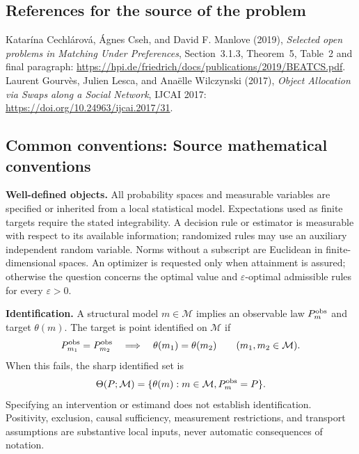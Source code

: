 \documentclass[11pt,a4paper]{article}
\begin{document}
\subsection*{References for the source of the problem}
Katar\'ina Cechl\'arov\'a, \'Agnes Cseh, and David F. Manlove (2019), \emph{Selected open problems in Matching Under Preferences}, Section~3.1.3, Theorem~5, Table~2 and final paragraph: \url{https://hpi.de/friedrich/docs/publications/2019/BEATCS.pdf}. Laurent Gourv\`es, Julien Lesca, and Ana\"elle Wilczynski (2017), \emph{Object Allocation via Swaps along a Social Network}, IJCAI 2017: \url{https://doi.org/10.24963/ijcai.2017/31}.

\subsection*{Common conventions: Source mathematical conventions}

\textbf{Well-defined objects.}
All probability spaces and measurable variables are specified or inherited
from a local statistical model. Expectations used as finite targets require
the stated integrability. A decision rule or estimator is measurable with
respect to its available information; randomized rules may use an auxiliary
independent random variable. Norms without a subscript are Euclidean in
finite-dimensional spaces. An optimizer is requested only when attainment
is assured; otherwise the question concerns the optimal value and
$\varepsilon$-optimal admissible rules for every $\varepsilon>0$.

\textbf{Identification.}
A structural model $m\in\mathcal M$ implies an observable law
$P_m^{\rm obs}$ and target $\theta(m)$. The target is point identified on
$\mathcal M$ if
\[
 P_{m_1}^{\rm obs}=P_{m_2}^{\rm obs}
 \quad\Longrightarrow\quad\theta(m_1)=\theta(m_2)
 \qquad(m_1,m_2\in\mathcal M).
\]
When this fails, the sharp identified set is
\[
 \Theta(P;\mathcal M)=\{\theta(m):m\in\mathcal M,
                                  P_m^{\rm obs}=P\}.
\]
Specifying an intervention or estimand does not establish identification.
Positivity, exclusion, causal sufficiency, measurement restrictions, and
transport assumptions are substantive local inputs, never automatic
consequences of notation.
\end{document}
